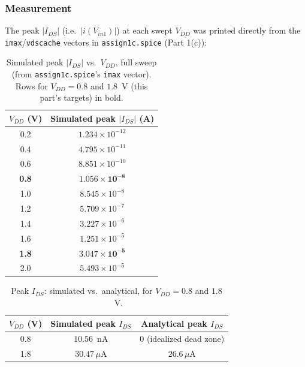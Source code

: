 \subsubsection{Measurement}

The peak $|I_{DS}|$ (i.e.\ $|i(V_{in1})|$) at each swept $V_{DD}$ was printed
directly from the \texttt{imax}/\texttt{vdscache} vectors in
\texttt{assign1c.spice} (Part 1(c)):

\begin{table}[h]
  \centering
  \begin{tabular}{|c|c|}
    \hline
    $V_{DD}$ (V) & Simulated peak $|I_{DS}|$ (A) \\
    \hline
    0.2 & $1.234\times10^{-12}$ \\
    0.4 & $4.795\times10^{-11}$ \\
    0.6 & $8.851\times10^{-10}$ \\
    \textbf{0.8} & $\mathbf{1.056\times10^{-8}}$ \\
    1.0 & $8.545\times10^{-8}$ \\
    1.2 & $5.709\times10^{-7}$ \\
    1.4 & $3.227\times10^{-6}$ \\
    1.6 & $1.251\times10^{-5}$ \\
    \textbf{1.8} & $\mathbf{3.047\times10^{-5}}$ \\
    2.0 & $5.493\times10^{-5}$ \\
    \hline
  \end{tabular}
  \caption{Simulated peak $|I_{DS}|$ vs.\ $V_{DD}$, full sweep (from
  \texttt{assign1c.spice}'s \texttt{imax} vector). Rows for $V_{DD}=0.8$ and
  $1.8$~V (this part's targets) in bold.}
  \label{tab:1d-peak-ids-full}
\end{table}

\begin{table}[h]
  \centering
  \begin{tabular}{|c|c|c|}
    \hline
    $V_{DD}$ (V) & Simulated peak $I_{DS}$ & Analytical peak $I_{DS}$ \\
    \hline
    0.8 & $10.56$~nA & $0$ (idealized dead zone) \\
    1.8 & $30.47\,\mu\text{A}$ & $26.6\,\mu\text{A}$ \\
    \hline
  \end{tabular}
  \caption{Peak $I_{DS}$: simulated vs.\ analytical, for $V_{DD}=0.8$ and
  $1.8$~V.}
  \label{tab:1d-peak-ids}
\end{table}

